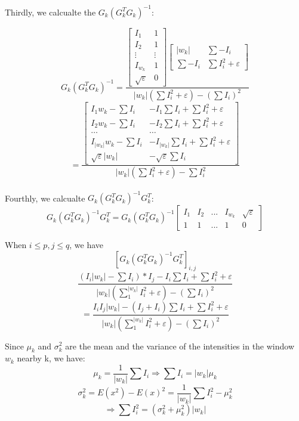 \documentclass[11pt,letterpaper]{article}
\begin{document}
Thirdly, we calcualte the $G_k(G_k^TG_k)^{-1}$:

$$G_k(G_k^TG_k)^{-1} = \frac{\begin{bmatrix}
    I_1 & 1 \\ I_2 & 1 \\ \vdots & \vdots \\ I_{w_k} & 1 \\ \sqrt{\varepsilon} & 0 
  \end{bmatrix} 
  \begin{bmatrix}
    |w_k| & \sum -I_i \\
    \sum -I_i & \sum I_i^2 + \varepsilon
  \end{bmatrix}}{|w_k|(\sum I_i^2 + \varepsilon) - (\sum I_i)^2} $$
$$ = \frac{\begin{bmatrix}
    I_1w_k - \sum I_i & -I_1 \sum I_i + \sum I_i^2 + \varepsilon \\
    I_2w_k - \sum I_i & -I_2 \sum I_i + \sum I_i^2 + \varepsilon \\
    \hdots & \hdots \\
    I_{|w_k|}w_k - \sum I_i & -I_{|w_k|} \sum I_i + \sum I_i^2 + \varepsilon \\
    \sqrt{\varepsilon}|w_k| & -\sqrt{\varepsilon}\sum I_i
  \end{bmatrix}}{|w_k|(\sum I_i^2 + \varepsilon) - \sum I_i^2}$$\\
Fourthly, we calcualte $G_k(G_k^TG_k)^{-1}G_k^T $:
$$G_k(G_k^TG_k)^{-1}G_k^T = G_k(G_k^TG_k)^{-1}
  \begin{bmatrix}
    I_1 & I_2 & ... & I_{w_k} & \sqrt{\varepsilon}\\
    1 & 1 & ... & 1 & 0 
  \end{bmatrix} $$

When $i \le p, j \le q$, we have 
$$[G_k(G_k^TG_k)^{-1}G_k^T]_{i, j} $$
$$ \frac{(I_i |w_k| - \sum I_i) * I_j - I_i \sum I_i + \sum I_i^2 + \varepsilon}{|w_k|(\sum_{1}^{|w_k|} I_i^2 + \varepsilon) - (\sum I_i)^2}$$
$$= \frac{I_i I_j |w_k| - (I_j + I_i)\sum I_i + \sum I_i^2 + \varepsilon}{|w_k|(\sum_{1}^{|w_k|} I_i^2 + \varepsilon) - (\sum I_i)^2}$$

Since $\mu_k$ and $\sigma_k^2$ are the mean and the variance of the intensities in the window $w_k$  nearby k, we have:
$$\mu_k = \frac{1}{|w_k|}\sum I_i \Rightarrow \sum I_i = |w_k|\mu_k$$
$$\sigma_k^2 = E(x^2) - E(x)^2 = \frac{1}{|w_k|}\sum I_i^2 - \mu_k^2 $$
$$\Rightarrow \sum I_i^2 = (\sigma_k^2 + \mu_k^2)|w_k|$$
\end{document}
